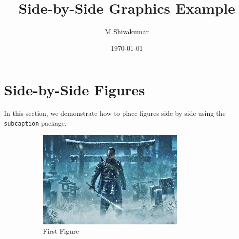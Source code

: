 \documentclass[a4paper, 12pt]{article}
\begin{document}
\title{Side-by-Side Graphics Example}
\author{M Shivakumar} %
\date{\today}
\maketitle
\section{Side-by-Side Figures}
In this section, we demonstrate how to place figures side by side using the \texttt{subcaption} package.
\begin{figure}[h!]
\centering
\begin{subfigure}[b]{0.45\textwidth}
\centering
\includegraphics[width=\textwidth]{Ghost1.jpg} %
\caption{First Figure}
\label{fig:fig1}
\end{subfigure}
\hfill
\begin{subfigure}[b]{0.45\textwidth}
\centering

\end{subfigure}
\end{figure}
\end{document}
